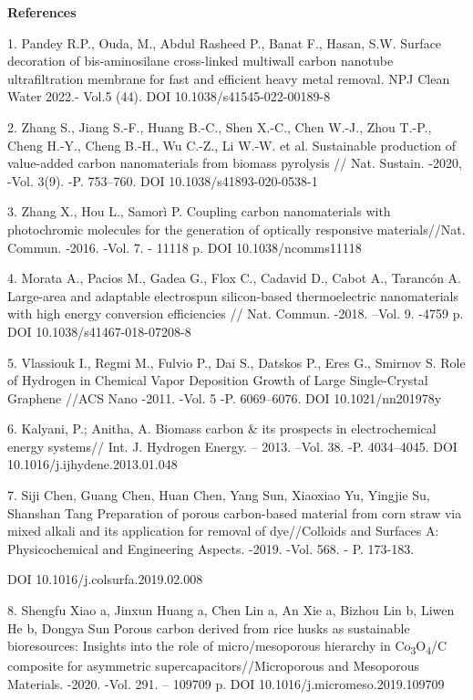 \begin{center}
{\bfseries References}
\end{center}

\begin{noparindent}
1. Pandey R.P., Ouda, M., Abdul Rasheed P., Banat F., Hasan, S.W. Surface
  decoration of bis-aminosilane cross-linked multiwall carbon nanotube
  ultrafiltration membrane for fast and efficient heavy metal removal.
  NPJ Clean Water 2022.- Vol.5 (44). DOI 10.1038/s41545-022-00189-8

2. Zhang S., Jiang S.-F., Huang B.-C., Shen X.-C., Chen W.-J., Zhou
  T.-P., Cheng H.-Y., Cheng B.-H., Wu C.-Z., Li W.-W. et al. Sustainable
  production of value-added carbon nanomaterials from biomass pyrolysis
  // Nat. Sustain. -2020, -Vol. 3(9). -P. 753--760. DOI
  10.1038/s41893-020-0538-1

3. Zhang X., Hou L., Samorì P. Coupling carbon nanomaterials with
  photochromic molecules for the generation of optically responsive
  materials//Nat. Commun. -2016. -Vol. 7. - 11118 p. DOI
  10.1038/ncomms11118

4. Morata A., Pacios M., Gadea G., Flox C., Cadavid D., Cabot A.,
  Tarancón A. Large-area and adaptable electrospun silicon-based
  thermoelectric nanomaterials with high energy conversion efficiencies
  // Nat. Commun. -2018. --Vol. 9. -4759 p. DOI
  10.1038/s41467-018-07208-8

5. Vlassiouk I., Regmi M., Fulvio P., Dai S., Datskos P., Eres G.,
  Smirnov S. Role of Hydrogen in Chemical Vapor Deposition Growth of
  Large Single-Crystal Graphene //ACS Nano -2011. -Vol. 5 -P.
  6069--6076. DOI 10.1021/nn201978y

6. Kalyani, P.; Anitha, A. Biomass carbon \& its prospects in
  electrochemical energy systems// Int. J. Hydrogen Energy. -- 2013.
  --Vol. 38. -P. 4034--4045. DOI 10.1016/j.ijhydene.2013.01.048

7. Siji Chen, Guang Chen, Huan Chen, Yang Sun, Xiaoxiao Yu, Yingjie Su,
  Shanshan Tang Preparation of porous carbon-based material from corn
  straw via mixed alkali and its application for removal of
  dye//Colloids and Surfaces A: Physicochemical and Engineering Aspects.
  -2019. -Vol. 568. - P. 173-183.

  DOI 10.1016/j.colsurfa.2019.02.008

8. Shengfu Xiao a, Jinxun Huang a, Chen Lin a, An Xie a, Bizhou Lin b,
  Liwen He b, Dongya Sun Porous carbon derived from rice husks as
  sustainable bioresources: Insights into the role of micro/mesoporous
  hierarchy in Co\textsubscript{3}O\textsubscript{4}/C composite for
  asymmetric supercapacitors//Microporous and Mesoporous Materials.
  -2020. -Vol. 291. -- 109709 p. DOI 10.1016/j.micromeso.2019.109709


\end{noparindent}
